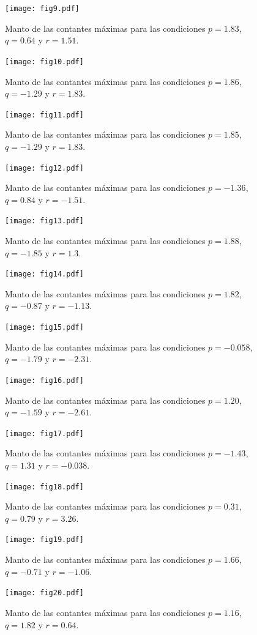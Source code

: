 \documentclass[10pt]{report}
\numberwithin{equation}{chapter}
\numberwithin{algorithm}{chapter}
\begin{document}
\begin{figure}
\center
\texttt{[image: fig9.pdf]}
\caption{Manto de las contantes máximas para las condiciones $p=1.83$, $q=0.64$ y $r=1.51$.}
\end{figure}
\begin{figure}
\center
\texttt{[image: fig10.pdf]}
\caption{Manto de las contantes máximas para las condiciones $p=1.86$, $q=-1.29$ y $r=1.83$.}
\end{figure}
\begin{figure}
\center
\texttt{[image: fig11.pdf]}
\caption{Manto de las contantes máximas para las condiciones $p=1.85$, $q=-1.29$ y $r=1.83$.}
\end{figure}
\begin{figure}
\center
\texttt{[image: fig12.pdf]}
\caption{Manto de las contantes máximas para las condiciones $p=-1.36$, $q=0.84$ y $r=-1.51$.}
\end{figure}
\begin{figure}
\center
\texttt{[image: fig13.pdf]}
\caption{Manto de las contantes máximas para las condiciones $p=1.88$, $q=-1.85$ y $r=1.3$.}
\end{figure}
\begin{figure}
\center
\texttt{[image: fig14.pdf]}
\caption{Manto de las contantes máximas para las condiciones $p=1.82$, $q=-0.87$ y $r=-1.13$.}
\end{figure}
\begin{figure}
\center
\texttt{[image: fig15.pdf]}
\caption{Manto de las contantes máximas para las condiciones $p=-0.058$, $q=-1.79$ y $r=-2.31$.}
\end{figure}
\begin{figure}
\center
\texttt{[image: fig16.pdf]}
\caption{Manto de las contantes máximas para las condiciones $p=1.20$, $q=-1.59$ y $r=-2.61$.}
\end{figure}
\begin{figure}
\center
\texttt{[image: fig17.pdf]}
\caption{Manto de las contantes máximas para las condiciones $p=-1.43$, $q=1.31$ y $r=-0.038$.}
\end{figure}
\begin{figure}



\center
\texttt{[image: fig18.pdf]}
\caption{Manto de las contantes máximas para las condiciones $p=0.31$, $q=0.79$ y $r=3.26$.}
\end{figure}
\newpage
\begin{figure}
\texttt{[image: fig19.pdf]}
\caption{Manto de las contantes máximas para las condiciones $p=1.66$, $q=-0.71$ y $r=-1.06$.}
\end{figure}
\begin{figure}
\center
\texttt{[image: fig20.pdf]}
\caption{Manto de las contantes máximas para las condiciones $p=1.16$, $q=1.82$ y $r=0.64$.}
\end{figure}
\end{document}
